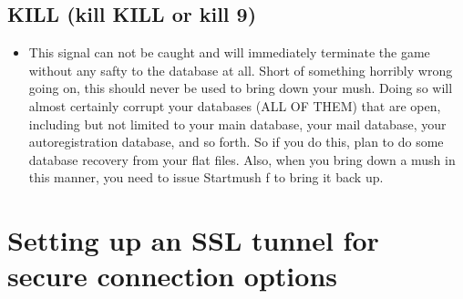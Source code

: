 \documentclass[letterpaper,10pt,english]{sphinxmanual}
\begin{document}
\section{KILL (kill \sphinxhyphen{}KILL or kill \sphinxhyphen{}9)}
\label{\detokenize{13-signals:kill-kill-kill-or-kill-9}}\begin{itemize}
\item {} 
\sphinxAtStartPar
This signal can not be caught and will immediately terminate the game
without any safty to the database at all.  Short of something horribly
wrong going on, this should never be used to bring down your mush.
Doing so will almost certainly corrupt your databases (ALL OF THEM)
that are open, including but not limited to your main database, your
mail database, your autoregistration database, and so forth.  So if
you do this, plan to do some database recovery from your flat files.
Also, when you bring down a mush in this manner, you need to issue
Startmush \sphinxhyphen{}f to bring it back up.

\end{itemize}


\chapter{Setting up an SSL tunnel for secure connection options}
\label{\detokenize{14-ssl:setting-up-an-ssl-tunnel-for-secure-connection-options}}\label{\detokenize{14-ssl::doc}}
\end{document}
